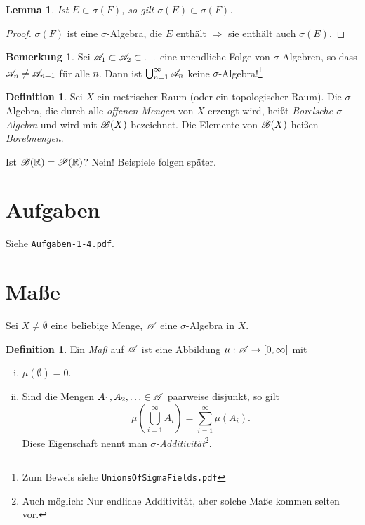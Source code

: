 \documentclass[
 a4paper,
 12pt,
 parskip=half
 ]{scrreprt}
\theoremstyle{plain}
\newtheorem{lem}[thm]{Lemma}
\theoremstyle{definition}
\newtheorem{defn}[thm]{Definition}
\newtheorem{rmrk}[thm]{Bemerkung}
\numberwithin{equation}{section}
\begin{document}
\begin{lem}
 Ist $E \subset \sigma(F)$, so gilt $\sigma(E) \subset \sigma(F)$.
\end{lem}

\begin{proof}
 $\sigma(F)$ ist eine $\sigma$-Algebra, die $E$ enthält $\Rightarrow$ sie enthält auch $\sigma(E)$.
\end{proof}

\begin{rmrk}
 Sei $\mathscr{A}_1 \subset \mathscr{A}_2 \subset \ldots$ eine unendliche Folge von $\sigma$-Algebren, so dass $\mathscr{A}_n \ne \mathscr{A}_{n+1}$ für alle $n$. Dann ist $\bigcup_{n=1}^{\infty} \mathscr{A}_n$ keine $\sigma$-Algebra!\footnote{Zum Beweis siehe \texttt{UnionsOfSigmaFields.pdf}}
\end{rmrk}

\begin{defn}
 Sei $X$ ein metrischer Raum (oder ein topologischer Raum). Die $\sigma$-Algebra, die durch alle \emph{offenen Mengen} von $X$ erzeugt wird, heißt \emph{Borelsche $\sigma$-Algebra} und wird mit $\mathscr{B}(X)$ bezeichnet. Die Elemente von $\mathscr{B}(X)$ heißen \emph{Borelmengen}.
\end{defn}

Ist $\mathscr{B}(\mathbb{R}) = \mathscr{P}(\mathbb{R})$? Nein! Beispiele folgen später.

\section{Aufgaben}
Siehe \verb+Aufgaben-1-4.pdf+.

\section{Maße}
Sei $X \ne \emptyset$ eine beliebige Menge, $\mathscr{A}$ eine $\sigma$-Algebra in $X$.

\begin{defn}
 Ein \emph{Maß} auf $\mathscr{A}$ ist eine Abbildung $\mu: \mathscr{A} \to [0,\infty]$ mit
 \begin{enumerate}[(i)]
  \item $\mu( \emptyset ) = 0$.
  \item Sind die Mengen $A_1, A_2, \ldots \in \mathscr{A}$ paarweise disjunkt, so gilt
  \[ \mu\left( \bigcup_{i=1}^\infty A_i \right) = \sum_{i=1}^\infty \mu(A_i). \]
  Diese Eigenschaft nennt man \emph{$\sigma$-Additivität}\footnote{Auch möglich: Nur endliche Additivität, aber solche Maße kommen selten vor.}.
 \end{enumerate}
\end{defn}
\end{document}
